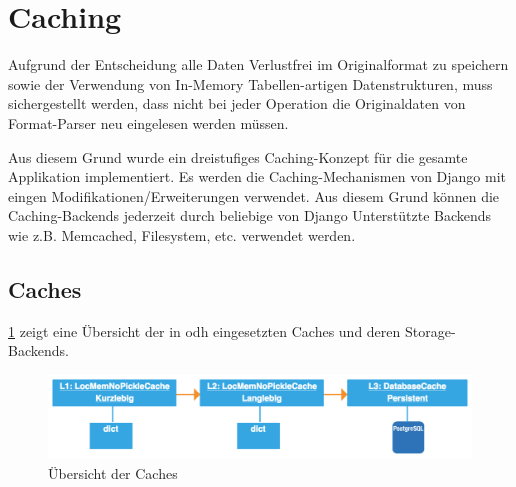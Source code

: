 
\section{Caching}
Aufgrund der Entscheidung alle Daten Verlustfrei im Originalformat zu speichern sowie der Verwendung von In-Memory Tabellen-artigen Datenstrukturen, muss sichergestellt werden, dass nicht bei jeder Operation die Originaldaten von Format-Parser neu eingelesen werden müssen.

Aus diesem Grund wurde ein dreistufiges Caching-Konzept für die gesamte Applikation implementiert. Es werden die Caching-Mechanismen von Django mit eingen Modifikationen/Erweiterungen verwendet. Aus diesem Grund können die Caching-Backends jederzeit durch beliebige von Django Unterstützte Backends wie z.B. Memcached, Filesystem, etc. verwendet werden.

\subsection{Caches}

\cref{fig:pd:caches} zeigt eine Übersicht der in \gls{odh} eingesetzten Caches und deren Storage-Backends.

\begin{figure}[H]
\centering
\includegraphics[width=\linewidth]{fig/caching.pdf}
\caption{Übersicht der Caches}
\label{fig:pd:caches}
\end{figure}


